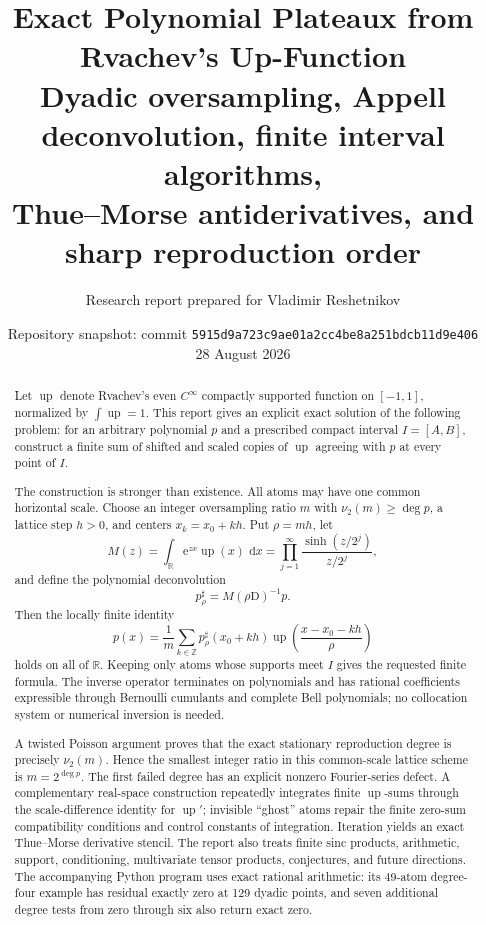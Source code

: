 \documentclass[11pt,oneside]{article}
\title{\bfseries Exact Polynomial Plateaux from Rvachev's Up-Function\\[0.35em]
\large Dyadic oversampling, Appell deconvolution, finite interval algorithms,\\
Thue--Morse antiderivatives, and sharp reproduction order}
\author{Research report prepared for Vladimir Reshetnikov}
\date{Repository snapshot: commit \texttt{5915d9a723c9ae01a2cc4be8a251bdcb11d9e406}\\28 August 2026}
\theoremstyle{definition}
\theoremstyle{remark}
\newcommand{\R}{\mathbb R}
\newcommand{\Z}{\mathbb Z}
\newcommand{\Up}{\operatorname{up}}
\newcommand{\vtwo}{\nu_2}
\newcommand{\dd}{\,\mathrm d}
\newcommand{\e}{\mathrm e}
\newcommand{\D}{\mathrm D}
\begin{document}
\maketitle

\begin{abstract}
Let \(\Up\) denote Rvachev's even \(C^\infty\) compactly supported function on
\([-1,1]\), normalized by \(\int\Up=1\).  This report gives an explicit exact
solution of the following problem: for an arbitrary polynomial \(p\) and a
prescribed compact interval \(I=[A,B]\), construct a finite sum of shifted and
scaled copies of \(\Up\) agreeing with \(p\) at every point of \(I\).

The construction is stronger than existence.  All atoms may have one common
horizontal scale.  Choose an integer oversampling ratio \(m\) with
\(\vtwo(m)\ge\deg p\), a lattice step \(h>0\), and centers
\(x_k=x_0+kh\).  Put \(\rho=mh\), let
\[
 M(z)=\int_\R \e^{zx}\Up(x)\,\dd x
     =\prod_{j=1}^{\infty}\frac{\sinh(z/2^j)}{z/2^j},
\]
and define the polynomial deconvolution
\[
 p_\rho^\sharp=M(\rho\D)^{-1}p.
\]
Then the locally finite identity
\[
 p(x)=\frac1m\sum_{k\in\Z}p_\rho^\sharp(x_0+kh)
       \Up\!\left(\frac{x-x_0-kh}{\rho}\right)
\]
holds on all of \(\R\).  Keeping only atoms whose supports meet \(I\) gives
the requested finite formula.  The inverse operator terminates on polynomials
and has rational coefficients expressible through Bernoulli cumulants and
complete Bell polynomials; no collocation system or numerical inversion is
needed.

A twisted Poisson argument proves that the exact stationary reproduction degree
is precisely \(\vtwo(m)\).  Hence the smallest integer ratio in this
common-scale lattice scheme is \(m=2^{\deg p}\).  The first failed degree has
an explicit nonzero Fourier-series defect.  A complementary real-space
construction repeatedly integrates finite \(\Up\)-sums through the
scale-difference identity for \(\Up'\); invisible ``ghost'' atoms repair the
finite zero-sum compatibility conditions and control constants of integration.
Iteration yields an exact Thue--Morse derivative stencil.  The report also
treats finite sinc products, arithmetic, support, conditioning, multivariate
tensor products, conjectures, and future directions.  The accompanying Python
program uses exact rational arithmetic: its 49-atom degree-four example has
residual exactly zero at 129 dyadic points, and seven additional degree tests
from zero through six also return exact zero.
\end{abstract}
\end{document}
